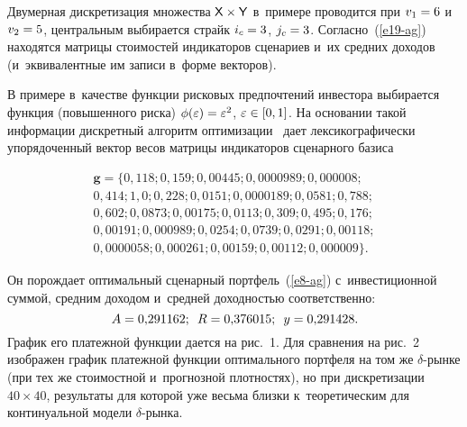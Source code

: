 \begin{multicols}{2}
  \vspace*{-3pt}
  
  Двумерная дискретизация множества ${\sf X}\times {\sf Y}$ в~примере 
проводится при $v_1 \hm= 6$ и~$v_2\hm = 5$, центральным выбирается страйк 
$i_c \hm= 3$, $j_c \hm= 3$. Согласно~(\ref{e19-ag}) находятся матрицы 
стоимостей индикаторов сценариев и~их средних доходов (и~эквивалентные им 
записи в~форме векторов). 
  
  В примере в~качестве функции рисковых предпочтений инвестора 
выбирается функция (повышенного риска) 
$\phi(\varepsilon) \hm= \varepsilon^2$, $\varepsilon\hm\in [0, 1]$. На основании 
такой информации дискретный алгоритм оптимизации~\cite{3-ag, 5-ag} дает 
лексикографически упорядоченный вектор весов матрицы индикаторов 
сценарного базиса 

\vspace*{-6pt}

\noindent
 \begin{multline*}
  \boldsymbol{g} = \{0{,}118; 0{,}159; 0{,}00445; 0{,}0000989; 0{,}000008;\\ 
  0{,}414; 1{,}0; 0{,}228; 0{,}0151; 0{,}0000189; 0{,}0581; 0{,}788;\\
  0{,}602; 0{,}0873; 0{,}00175; 0{,}0113; 0{,}309; 0{,}495; 0{,}176;\\
  0{,}00191; 0{,}000989; 0{,}0254; 0{,}0739; 0{,}0291; 0{,}00118;\\
  0{,}0000058; 0{,}000261; 0{,}00159; 0{,}00112;  0{,}000009\}.
\end{multline*}

\vspace*{-3pt}

\noindent 
  Он порождает оптимальный сценарный портфель~(\ref{e8-ag}) 
с~инвестиционной суммой, средним доходом и~средней доходностью 
соответственно: 
  $$
  A = 0{,}291162;\enskip R = 0{,}376015;\enskip y = 0{,}291428. 
  $$
  График его платежной функции дается на рис.~1. 
    Для сравнения на рис.~2 изображен график платежной функции 
оптимального портфеля на том же $\delta$-рын\-ке (при тех же стоимостной 
и~прогнозной плотностях), но при дискретизации $40\times40$, результаты для 
которой уже весьма близки к~теоретическим для континуальной модели 
$\delta$-рынка.


\end{multicols}
